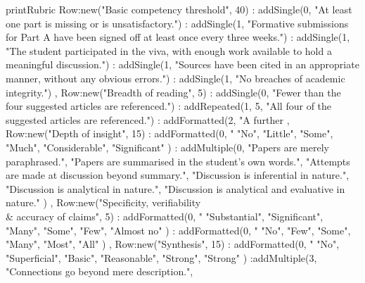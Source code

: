\documentclass{../../fal_assignment}
\begin{document}
\renewcommand{\refname}{Papers}
\nocite{*}



%

\begin{luacode*}
	printRubric {
		Row:new("Basic competency threshold", 40)
			: addSingle(0, "At least one part is missing or is unsatisfactory.")
			: addSingle(1, "Formative submissions for Part A have been signed off at least once every three weeks.")
			: addSingle(1, "The student participated in the viva, with enough work available to hold a meaningful discussion.")
			: addSingle(1, "Sources have been cited in an appropriate manner, without any obvious errors.")
			: addSingle(1, "No breaches of academic integrity.")
		,
		Row:new("Breadth of reading", 5)
			: addSingle(0, "Fewer than the four suggested articles are referenced.")
			: addRepeated(1, 5, "All four of the suggested articles are referenced.")
			: addFormatted(2, "A further %
		,
		Row:new("Depth of insight", 15)
			: addFormatted(0, "%
				{ "No", "Little", "Some", "Much", "Considerable", "Significant" })
			: addMultiple(0, {
				"Papers are merely paraphrased.",
				"Papers are summarised in the student's own words.",
				"Attempts are made at discussion beyond summary.",
				"Discussion is inferential in nature.",
				"Discussion is analytical in nature.",
				"Discussion is analytical and evaluative in nature." })
		,
		Row:new("Specificity, verifiability \\& accuracy of claims", 5)
			: addFormatted(0, "%
				{ "Substantial", "Significant", "Many", "Some", "Few", "Almost no" })
			: addFormatted(0, "%
				{ "No", "Few", "Some", "Many", "Most", "All" })
		,
		Row:new("Synthesis", 15)
			: addFormatted(0, "%
				{ "No", "Superficial", "Basic", "Reasonable", "Strong", "Strong" })
			:addMultiple(3, {
				"Connections go beyond mere description.",
}}
\end{luacode*}
\end{document}
